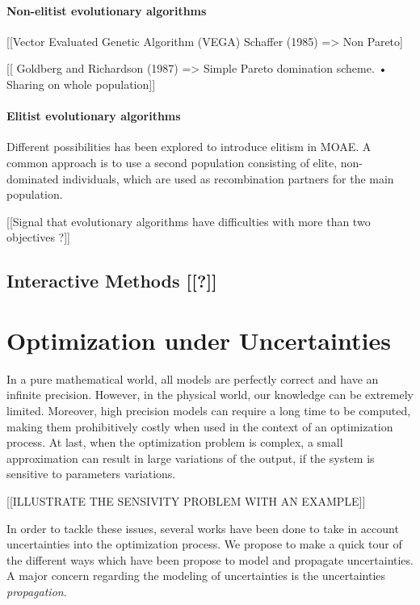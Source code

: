 \subsubsection{Non-elitist evolutionary algorithms}

[[Vector Evaluated Genetic Algorithm (VEGA) Schaffer (1985) => Non Pareto]

[[  Goldberg and Richardson (1987) =>  Simple Pareto domination scheme. • Sharing on whole population]]


\subsubsection{Elitist evolutionary algorithms}

Different possibilities has been explored to introduce elitism in MOAE. A common approach is to use a second population consisting of elite, non-dominated individuals, which are used as recombination partners for the main population.

[[Signal that evolutionary algorithms have difficulties with more than two objectives ?]]

\section{Interactive Methods [[?]]}

\chapter{Optimization under Uncertainties}

In a pure mathematical world, all models are perfectly correct and have an infinite precision. However, in the physical world, our knowledge can be extremely limited. Moreover, high precision models can require a long time to be computed, making them prohibitively costly when used in the context of an optimization process. At last, when the optimization problem is complex, a small approximation can result in large variations of the output, if the system is sensitive to parameters variations.

[[ILLUSTRATE THE SENSIVITY PROBLEM WITH AN EXAMPLE]]

In order to tackle these issues, several works have been done to take in account uncertainties into the optimization process. We propose to make a quick tour of the different ways which have been propose to model and propagate uncertainties.
A major concern regarding the modeling of uncertainties is the uncertainties \emph{propagation}. 


